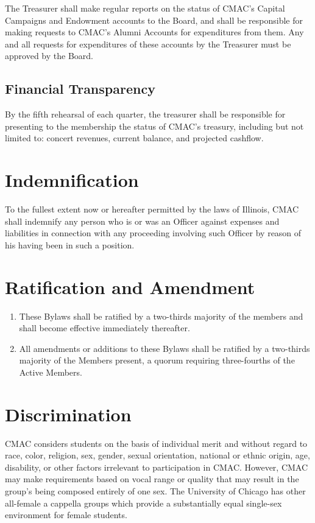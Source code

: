 \documentclass{article}
\begin{document}
The Treasurer shall make regular reports on the status of CMAC's Capital
Campaigns and Endowment accounts to the Board, and shall be responsible
for making requests to CMAC's Alumni Accounts for expenditures from
them. Any and all requests for expenditures of these accounts by the
Treasurer must be approved by the Board.

\subsection{Financial Transparency}

By the fifth rehearsal of each quarter, the treasurer shall be responsible
for presenting to the membership the status of CMAC's treasury, including
but not limited to: concert revenues, current balance, and projected
cashflow.

\section{Indemnification}

To the fullest extent now or hereafter permitted by the laws of Illinois,
CMAC shall indemnify any person who is or was an Officer against expenses
and liabilities in connection with any proceeding involving such Officer
by reason of his having been in such a position.

\section{Ratification and Amendment}
\begin{enumerate}
\item These Bylaws shall be ratified by a two-thirds majority of the members
and shall become effective immediately thereafter.
\item All amendments or additions to these Bylaws shall be ratified by a
two-thirds majority of the Members present, a quorum requiring three-fourths
of the Active Members.
\end{enumerate}

\section{Discrimination}

CMAC considers students on the basis of individual
merit and without regard to race, color, religion, sex, gender, sexual
orientation, national or ethnic origin, age, disability, or other
factors irrelevant to participation in CMAC. However,
CMAC may make requirements based on vocal range or quality that may
result in the group's being composed entirely of one
sex. The University of Chicago has other all-female a cappella groups
which provide a substantially equal single-sex environment for female
students.
\end{document}
